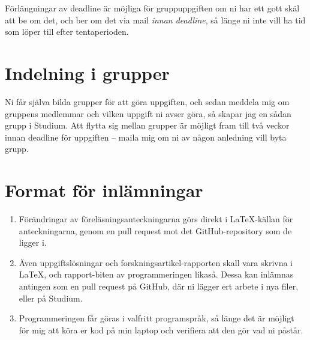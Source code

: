 \documentclass{tufte-handout}
\begin{document}
Förlängningar av deadline är möjliga för gruppuppgiften om ni har ett gott skäl att be om det, och ber om det via mail \emph{innan deadline}, så länge ni inte vill ha tid som löper till efter tentaperioden.

\section{Indelning i grupper}

Ni får själva bilda grupper för att göra uppgiften, och sedan meddela mig om gruppens medlemmar och vilken uppgift ni avser göra, så skapar jag en sådan grupp i Studium. Att flytta sig mellan grupper är möjligt fram till två veckor innan deadline för uppgiften -- maila mig om ni av någon anledning vill byta grupp.

\section{Format för inlämningar}

\begin{enumerate}
	\item Förändringar av föreläsningsanteckningarna görs direkt i \LaTeX-källan för anteckningarna, genom en pull request mot det GitHub-repository som de ligger i.
	\item Även uppgiftslösningar och forskningsartikel-rapporten skall vara skrivna i \LaTeX, och rapport-biten av programmeringen likaså. Dessa kan inlämnas antingen som en pull request på GitHub, där ni lägger ert arbete i nya filer, eller på Studium.
	\item Programmeringen får göras i valfritt programspråk, så länge det är möjligt för mig att köra er kod på min laptop och verifiera att den gör vad ni påstår.
\end{enumerate}



\end{document}
